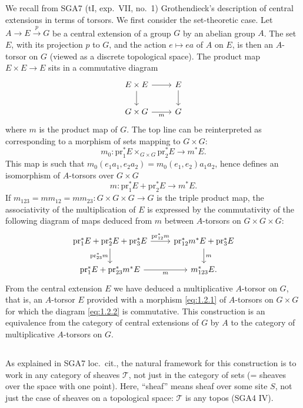 \documentclass[11pt,a4paper]{article}
\theoremstyle{plain}
\theoremstyle{definition}
\newcommand{\cT}{\mathcal{T}}
\newcommand{\pr}{\mathrm{pr}}
\begin{document}
\subsection{}
We recall from SGA7 (tI, exp.~VII, no.~1) Grothendieck's description of central extensions in terms of torsors. We first consider the set-theoretic case. Let $A \to E \xrightarrow{p} G$ be a central extension of a group $G$ by an abelian group $A$. The set $E$, with its projection $p$ to $G$, and the action $e \mapsto ea$ of $A$ on $E$, is then an $A$-torsor on $G$ (viewed as a discrete topological space). The product map $E \times E \to E$ sits in a commutative diagram
\[
\begin{tikzcd}
E \times E \arrow[r] \arrow[d] & E \arrow[d] \\
G \times G \arrow[r, "m"'] & G
\end{tikzcd}
\]
where $m$ is the product map of $G$. The top line can be reinterpreted as corresponding to a morphism of sets mapping to $G \times G$:
\[m_0: \pr_1^*E \times_{G \times G} \pr_2^*E \to m^*E.\]
This map is such that $m_0(e_1a_1, e_2a_2) = m_0(e_1, e_2) a_1 a_2$, hence defines an isomorphism of $A$-torsors over $G \times G$
\begin{equation}\label{eq:1.2.1}
m: \pr_1^* E + \pr_2^* E \to m^* E.
\end{equation}
If $m_{123} = m m_{12} = m m_{23}: G \times G \times G \to G$ is the triple product map, the associativity of the multiplication of $E$ is expressed by the commutativity of the following diagram of maps deduced from $m$ between $A$-torsors on $G \times G \times G$:
\begin{equation}\label{eq:1.2.2}
\begin{tikzcd}
\pr_1^* E + \pr_2^* E + \pr_3^* E \arrow[r, "{\pr_{12}^* m}"] \arrow[d, "{\pr_{23}^* m}"'] & \pr_{12}^* m^* E + \pr_3^* E \arrow[d, "m"] \\
\pr_1^* E + \pr_{23}^* m^* E \arrow[r, "m"'] & m_{123}^* E.
\end{tikzcd}
\end{equation}
From the central extension $E$ we have deduced a multiplicative $A$-torsor on $G$, that is, an $A$-torsor $E$ provided with a morphism \eqref{eq:1.2.1} of $A$-torsors on $G \times G$ for which the diagram \eqref{eq:1.2.2} is commutative. This construction is an equivalence from the category of central extensions of $G$ by $A$ to the category of multiplicative $A$-torsors on $G$.

\subsection{}
As explained in SGA7 loc.~cit., the natural framework for this construction is to work in any category of sheaves $\cT$, not just in the category of sets (= sheaves over the space with one point). Here, ``sheaf'' means sheaf over some site $S$, not just the case of sheaves on a topological space: $\cT$ is any topos (SGA4 IV).
\end{document}
